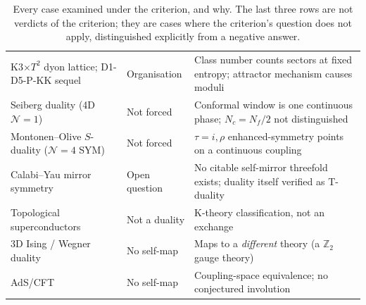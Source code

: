 \documentclass[11pt,a4paper]{article}
\begin{document}
\begin{table}[h]
\begin{tabular}{@{}p{3.6cm}p{2.6cm}p{5.7cm}@{}}
K3$\times T^2$ dyon lattice; D1-D5-P-KK sequel & Organisation & Class number counts sectors at fixed entropy; attractor mechanism causes moduli~\cite{Moore1998,Sen2008review} \\
Seiberg duality (4D $\mathcal N=1$) & Not forced & Conformal window is one continuous phase; $N_c=N_f/2$ not distinguished~\cite{Seiberg1994} \\
Montonen--Olive $S$-duality ($\mathcal N=4$ SYM) & Not forced & $\tau=i,\rho$ enhanced-symmetry points on a continuous coupling~\cite{MontonenOlive1977,KapustinWitten2007} \\
Calabi--Yau mirror symmetry & Open question & No citable self-mirror threefold exists; duality itself verified as T-duality~\cite{StromingerYauZaslow1996} \\
\midrule
Topological superconductors & Not a duality & K-theory classification, not an exchange~\cite{RyuSchnyderFurusakiLudwig2010} \\
3D Ising / Wegner duality & No self-map & Maps to a \emph{different} theory (a $\mathbb Z_2$ gauge theory)~\cite{Wegner1971} \\
AdS/CFT & No self-map & Coupling-space equivalence; no conjectured involution~\cite{Maldacena1998} \\
\bottomrule
\end{tabular}
\caption{Every case examined under the criterion, and why. The last three rows are not verdicts of the
criterion; they are cases where the criterion's question does not apply, distinguished explicitly from
a negative answer.}
\label{tab:cases}
\end{table}
\end{document}
